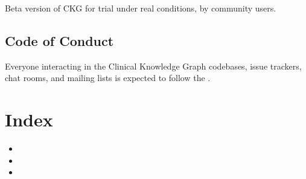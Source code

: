 \documentclass[letterpaper,10pt,english]{sphinxmanual}
\begin{document}
Beta version of CKG for trial under real conditions, by community users.


\section{Code of Conduct}
\label{\detokenize{MANIFEST:code-of-conduct}}\label{\detokenize{MANIFEST:id2}}
Everyone interacting in the Clinical Knowledge Graph codebases, issue trackers,
chat rooms, and mailing lists is expected to follow the .


\chapter{Index}
\label{\detokenize{index:index}}\begin{itemize}
\item {} 

\item {} 

\item {} 

\end{itemize}
\end{document}
